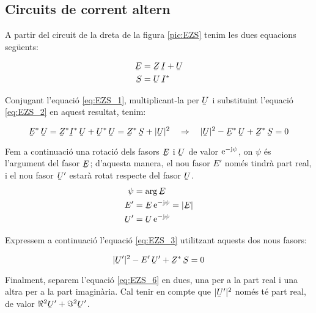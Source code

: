 \subsection{Circuits de corrent altern}

A partir del circuit de la dreta de la figura \vref{pic:EZS} tenim les dues equacions següents:

\begin{align}
   \cmplx{E} &= \cmplx{Z} \, \cmplx{I} + \cmplx{U} \label{eq:EZS_1} \\
   \cmplx{S} &= \cmplx{U} \, \cmplx{I}^*           \label{eq:EZS_2}
\end{align}

Conjugant l'equació \eqref{eq:EZS_1}, multiplicant-la per $\cmplx{U}$ i substituint l'equació \eqref{eq:EZS_2} en aquest resultat, tenim:

\begin{equation}
   \cmplx{E}^* \, \cmplx{U} = \cmplx{Z}^* \cmplx{I}^* \, \cmplx{U} + \cmplx{U}^* \, \cmplx{U} =
   \cmplx{Z}^* \, \cmplx{S} + |\cmplx{U}|^2 \quad \Rightarrow \quad
   |\cmplx{U}|^2 - \cmplx{E}^* \, \cmplx{U} + \cmplx{Z}^* \, \cmplx{S} = 0
   \label{eq:EZS_3}
\end{equation}

Fem a continuació una rotació dels fasors $\cmplx{E}$ i
$\cmplx{U}$ de valor $\mathrm{e}^{-\mathrm{j}\psi}$, on $\psi$ és l'argument
del fasor $\cmplx{E}$; d'aquesta manera, el nou fasor $E'$ només tindrà part real, i el nou fasor $\cmplx{U}'$ estarà rotat
respecte del fasor $\cmplx{U}$.
\begin{align}
   \psi &= \arg\cmplx{E} \label{eq:EZS_9} \\
   E' &= \cmplx{E} \, \eu^{-\ju\psi} = |\cmplx{E}|  \label{eq:EZS_4} \\
   \cmplx{U}' &= \cmplx{U} \, \eu^{-\ju\psi}   \label{eq:EZS_5}
\end{align}

Expressem a continuació l'equació \eqref{eq:EZS_3} utilitzant
aquests dos nous fasors:

\begin{equation}
   |\cmplx{U}'|^2 - E' \, \cmplx{U}' + \cmplx{Z}^* \, \cmplx{S} = 0 \label{eq:EZS_6}
\end{equation}

Finalment, separem l'equació \eqref{eq:EZS_6} en dues, una per a la part real i una altra per a la part imaginària. Cal tenir en compte que $|\cmplx{U}'|^2$ només té part real, de valor $\Re^2\cmplx{U}' + \Im^2\cmplx{U}'$.

